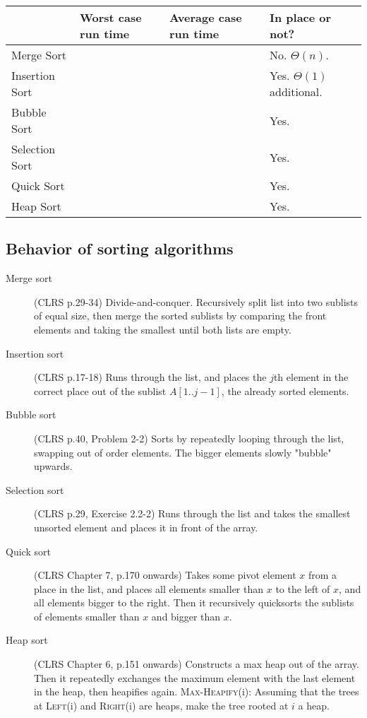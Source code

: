 \begin{tabularx}{\linewidth}{lXXX}
	\toprule
	               & \textbf{Worst case run time} & \textbf{Average case run time} & \textbf{In place or not?}      \\ \midrule
	Merge Sort     & \nlgn                        & \nlgn                          & No. $ \Theta(n) $.             \\
	Insertion Sort & \nn                          & \nn                            & Yes. $ \Theta(1) $ additional. \\
	Bubble Sort    & \nn                          & \nn                            & Yes.                           \\
	Selection Sort & \nn                          & \nn                            & Yes.                           \\
	Quick Sort     & \nn                          & \nlgn                          & Yes.                           \\
	Heap Sort      & \nlgn                        & \nlgn                          & Yes.                           \\ \bottomrule
\end{tabularx}

\subsection{Behavior of sorting algorithms}

\begin{description}
	\item[Merge sort] (CLRS p.29-34) Divide-and-conquer. Recursively split list into two sublists of equal size, then merge the sorted sublists by comparing the front elements and taking the smallest until both lists are empty. 
	\item[Insertion sort] (CLRS p.17-18) Runs through the list, and places the $j$th element in the correct place out of the sublist $A[1..j-1]$, the already sorted elements. 
	\item[Bubble sort] (CLRS p.40, Problem 2-2) Sorts by repeatedly looping through the list, swapping out of order elements. The bigger elements slowly "bubble" upwards. 
	\item[Selection sort] (CLRS p.29, Exercise 2.2-2) Runs through the list and takes the smallest unsorted element and places it in front of the array. 
	\item[Quick sort] (CLRS Chapter 7, p.170 onwards) Takes some pivot element $x$ from a place in the list, and places all elements smaller than $x$ to the left of $x$, and all elements bigger to the right. Then it recursively quicksorts the sublists of elements smaller than $x$ and bigger than $x$.
	\item[Heap sort] (CLRS Chapter 6, p.151 onwards) Constructs a max heap out of the array. Then it repeatedly exchanges the maximum element with the last element in the heap, then heapifies again. 
	\subitem \textsc{Max-Heapify}(i): Assuming that the trees at \textsc{Left}(i) and \textsc{Right}(i) are heaps, make the tree rooted at $i$ a heap. 
\end{description}